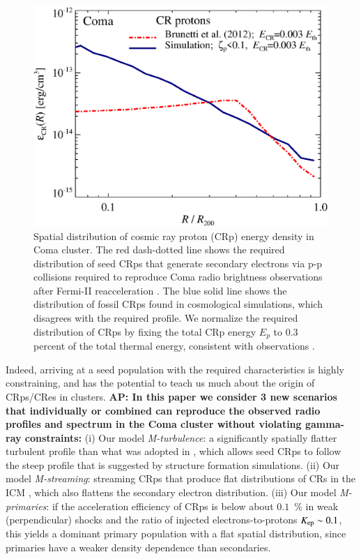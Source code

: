 \documentclass[useAMS,usenatbib]{mn2e}
\newcommand{\Mstream}{{\it M-streaming}\xspace}
\newcommand{\Mflatturb}{{\it M-turbulence}\xspace}
\newcommand{\Mprimary}{{\it M-primaries}\xspace}
\def\AP#1{{\bf  AP: #1}}
\begin{document}
\begin{figure}
  \begin{minipage}{1.0\columnwidth}
    \includegraphics[width=1.0\columnwidth]{figures/fCR.radius.coma.g72a.Rad14.2400p.z0.NL.xKR.eb23.eI066.DII.140.v5.halo.test5.eps}
    \caption{Spatial distribution of cosmic ray proton (CRp) energy
      density in Coma cluster. The red dash-dotted line shows the
      required distribution of seed CRps that generate secondary
      electrons via p-p collisions required to reproduce Coma radio
      brightness observations after Fermi-II reacceleration
      \citet{brunetti12}. The blue solid line shows the distribution of
      fossil CRps found in cosmological simulations, which disagrees
      with the required profile. We normalize the required distribution
      of CRps by fixing the total CRp energy $E_p$ to 0.3 percent of the
      total thermal energy, consistent with observations
      \citet{2014ApJ...787...18A,2012ApJ...757..123A}.}
    \label{fig:Edens}
  \end{minipage}
\end{figure}
Indeed, arriving at a seed population with the required
characteristics is highly constraining, and has the potential to teach
us much about the origin of CRps/CRes in clusters. \AP{In this paper
  we consider 3 new scenarios that individually or combined can
  reproduce the observed radio profiles and spectrum in the Coma
  cluster without violating gamma-ray constraints:} (i) Our model
\Mflatturb: a significantly spatially flatter turbulent profile than
what was adopted in \citep{brunetti12}, which allows seed CRps to
follow the steep profile that is suggested by structure formation
simulations. (ii) Our model \Mstream: streaming CRps that produce flat
distributions of CRs in the ICM
\citep{ensslin11,wiener13,2014MNRAS.438..124Z}, which also flattens
the secondary electron distribution. (iii) Our model \Mprimary: if the
acceleration efficiency of CRps is below about $0.1$~{\%} in weak
(perpendicular) shocks and the ratio of injected electrons-to-protons
$K_{{\mathrm{ep}}} \sim 0.1$, this yields a dominant primary population
with a flat spatial distribution, since primaries have a weaker
density dependence than secondaries. 
\end{document}
